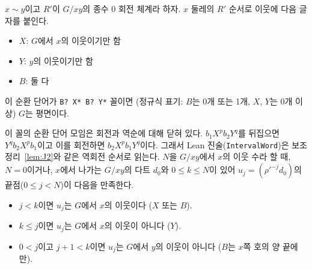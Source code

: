 \begin{lemma}
\label{lem:S}
\leanok
\(x \sim y\)이고 \(R'\)이 \(G/xy\)의 종수 0 회전 체계라 하자. \(x\) 둘레의 \(R'\) 순서로 이웃에 다음 글자를
붙인다.
\begin{itemize}
  \item \(X\): \(G\)에서 \(x\)의 이웃이기만 함
  \item \(Y\): \(y\)의 이웃이기만 함
  \item \(B\): 둘 다
\end{itemize}
이 순환 단어가 \texttt{B? X* B? Y*} 꼴이면 (정규식 표기: \(B\)는 0개 또는 1개, \(X\), \(Y\)는 0개 이상)
\(G\)는 평면이다.

이 꼴의 순환 단어 모임은 회전과 역순에 대해 닫혀 있다. \(b_1 X^p b_2 Y^q\)를 뒤집으면 \(Y^q b_2 X^p b_1\)이고 이를
회전하면 \(b_2 X^p b_1 Y^q\)이다. 그래서 Lean 진술(\texttt{IntervalWord})은 보조정리~\ref{lem:J2}와 같은 역회전 순서로
읽는다. \(N\)을 \(G/xy\)에서 \(x\)의 이웃 수라 할 때, \(N = 0\)이거나, \(x\)에서 나가는 \(G/xy\)의 다트 \(d_0\)와
\(0 \le k \le N\)이 있어 \(u_j = (\rho'^{-j} d_0)\)의 끝점(\(0 \le j < N\))이 다음을 만족한다.
\begin{itemize}
  \item \(j < k\)이면 \(u_j\)는 \(G\)에서 \(x\)의 이웃이다 (\(X\) 또는 \(B\)).
  \item \(k \le j\)이면 \(u_j\)는 \(G\)에서 \(x\)의 이웃이 아니다 (\(Y\)).
  \item \(0 < j\)이고 \(j + 1 < k\)이면 \(u_j\)는 \(G\)에서 \(y\)의 이웃이 아니다 (\(B\)는 \(x\)쪽 호의 양 끝에만).
\end{itemize}
\end{lemma}

